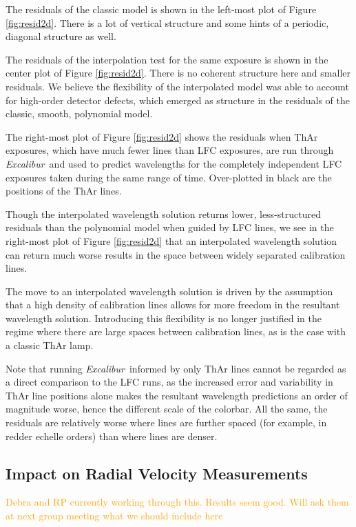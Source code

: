 \documentclass[twocolumn]{aastex63}
\newcommand{\lz}[1]{\textcolor{orange}{#1}}
\newcommand{\project}[1]{\textsl{#1}}
\newcommand{\name}{\project{Excalibur}}
\begin{document}
The residuals of the classic model is shown in the left-most plot of Figure \ref{fig:resid2d}.  There is a lot of vertical structure and some hints of a periodic, diagonal structure as well.

The residuals of the interpolation test for the same exposure is shown in the center plot of Figure \ref{fig:resid2d}.  There is no coherent structure here and smaller residuals.  We believe the flexibility of the interpolated model was able to account for high-order detector defects, which emerged as structure in the residuals of the classic, smooth, polynomial model.

The right-most plot of Figure \ref{fig:resid2d} shows the residuals when ThAr exposures, which have much fewer lines than LFC exposures, are run through \name\ and used to predict wavelengths for the completely independent LFC exposures taken during the same range of time.  Over-plotted in black are the positions of the ThAr lines.

Though the interpolated wavelength solution returns lower, less-structured residuals than the polynomial model when guided by LFC lines, we see in the right-most plot of Figure \ref{fig:resid2d} that an interpolated wavelength solution can return much worse results in the space between widely separated calibration lines.

The move to an interpolated wavelength solution is driven by the assumption that a high density of calibration lines allows for more freedom in the resultant wavelength solution.  Introducing this flexibility is no longer justified in the regime where there are large spaces between calibration lines, as is the case with a classic ThAr lamp.

Note that running \name\ informed by only ThAr lines cannot be regarded as a direct comparison to the LFC runs, as the increased error and variability in ThAr line positions alone makes the resultant wavelength predictions an order of magnitude worse, hence the different scale of the colorbar.  All the same, the residuals are relatively worse where lines are further spaced (for example, in redder echelle orders) than where lines are denser.

\subsection{Impact on Radial Velocity Measurements}\label{sec:test-rv}
\lz{Debra and RP currently working through this.  Results seem good.  Will ask them at next group meeting what we should include here}
\end{document}
